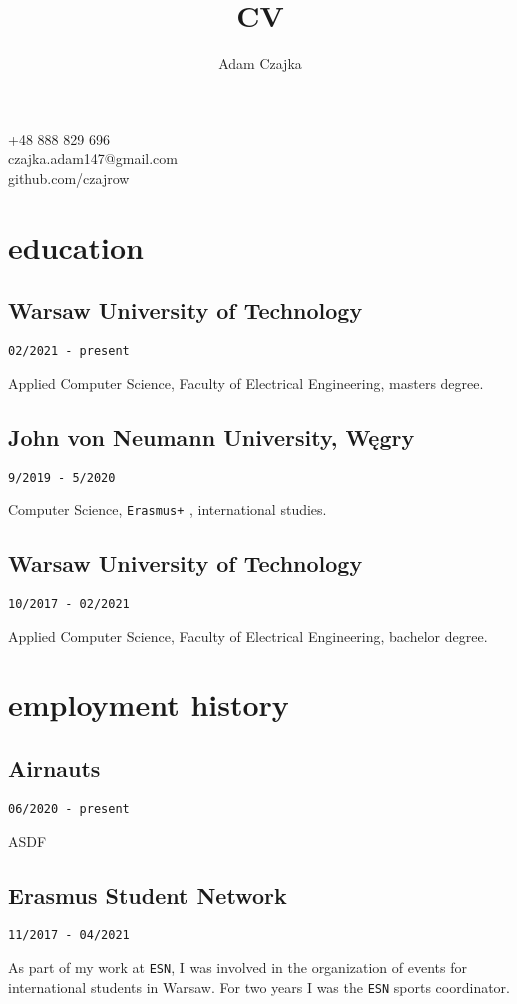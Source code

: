 \documentclass{article}
\makeatletter
\renewcommand{\maketitle}{
    \begin{center}



        {\huge\bfseries\theauthor}

        \vspace{.25em}

        +48 888 829 696\\czajka.adam147@gmail.com\\github.com/czajrow
	\end{center}
	\vspace{-.5cm}
}
\makeatother
\begin{document}
\title{CV}
\author{Adam Czajka}

\maketitle

\vspace{2em}

\begin{minipage}[t]{.5\textwidth}
	\section{education}

    \subsection{Warsaw University of Technology}
	\texttt{02/2021 - present}
	\par Applied Computer Science, Faculty of Electrical Engineering, masters degree.

    \subsection{John von Neumann University, Węgry}
	\texttt{9/2019 - 5/2020}
	\par Computer Science, \texttt{Erasmus+} , international studies.

	\subsection{Warsaw University of Technology}
	\texttt{10/2017 - 02/2021}
	\par Applied Computer Science, Faculty of Electrical Engineering, bachelor degree.

	\vspace{2em}

	\section{employment history}

    \subsection{Airnauts}
	\texttt{06/2020 - present}
	\par ASDF


	\subsection{Erasmus Student Network}
	\texttt{11/2017 - 04/2021}
	\par As part of my work at \texttt{ESN}, I was involved in the organization of events for international students in Warsaw. For two years I was the \texttt{ESN} sports coordinator.


\end{minipage}
\end{document}
